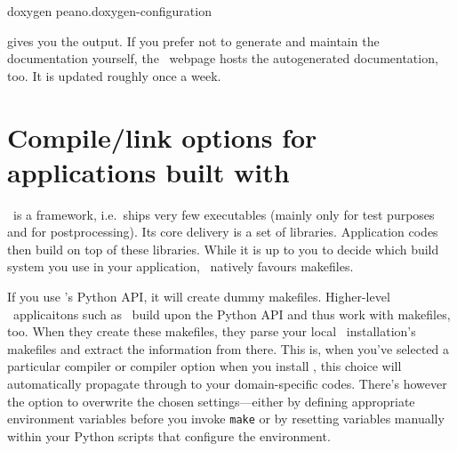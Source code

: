 \begin{code}
doxygen peano.doxygen-configuration
\end{code}

\noindent
gives you the output. If you prefer not to generate and maintain the
documentation yourself, the \Peano\ webpage hosts the autogenerated
documentation, too.
It is updated roughly once a week.



\section{Compile/link options for applications built with \Peano}
\label{section:installation:applications-built-with-Peano}

\Peano\ is a framework, i.e.~ships very few executables (mainly only for test
purposes and for postprocessing).
Its core delivery is a set of libraries.
Application codes then build on top of these libraries.
While it is up to you to decide which build system you use in your application,
\Peano\ natively favours makefiles.


If you use \Peano's Python API, it will create dummy makefiles.
Higher-level \Peano\ applicaitons such as \ExaHyPE\ build upon the Python API
and thus work with makefiles, too.
When they create these makefiles, they parse your local \Peano\ installation's
makefiles and extract the information from there.
This is, when you've selected a particular compiler or compiler option when you
install \Peano, this choice will automatically propagate through to your
domain-specific codes.
There's however the option to overwrite the chosen settings---either by defining
appropriate environment variables before you invoke \texttt{make} or by
resetting variables manually within your Python scripts that configure the
environment.



